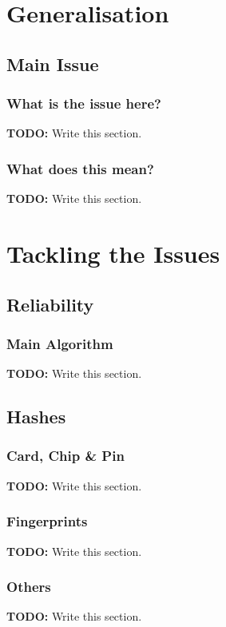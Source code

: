 \documentclass{beamer}
\begin{document}
  \section{Generalisation}
    \subsection{Main Issue}
      \begin{frame}
        \frametitle{What is the issue here?}
        \textbf{TODO:} Write this section.
      \end{frame}
      \begin{frame}
        \frametitle{What does this mean?}
        \textbf{TODO:} Write this section.
      \end{frame}
  \section{Tackling the Issues}
    \subsection{Reliability}
      \begin{frame}
        \frametitle{Main Algorithm}
        \textbf{TODO:} Write this section.
      \end{frame}
    \subsection{Hashes}
      \begin{frame}
        \frametitle{Card, Chip \& Pin}
        \textbf{TODO:} Write this section.
      \end{frame}
      \begin{frame}
        \frametitle{Fingerprints}
        \textbf{TODO:} Write this section.
      \end{frame}
      \begin{frame}
        \frametitle{Others}
        \textbf{TODO:} Write this section.
      \end{frame}
\end{document}
